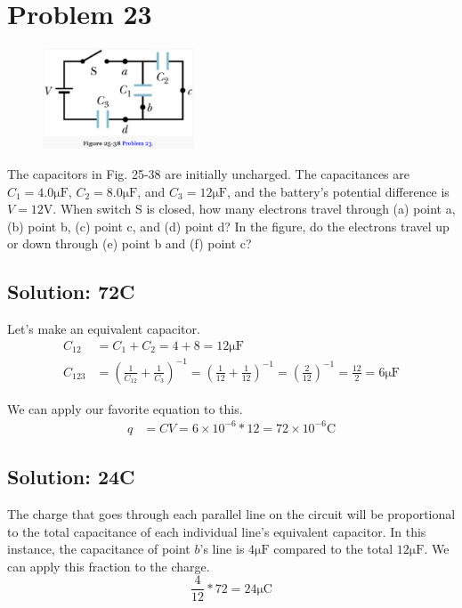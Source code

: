 \documentclass[12pt]{article}
\begin{document}
\pagebreak
\section{Problem 23}
\begin{figure}
    \vspace{-30pt}
    \includegraphics[width=0.4\textwidth]{picture_6.png} 
\end{figure}
The capacitors in Fig. 25-38 are initially uncharged. 
The capacitances are $C_1 = 4.0 \unit{\micro\farad}$, $C_2 = 8.0 \unit{\micro\farad}$, and $C_3 = 12 \unit{\micro\farad}$, and the battery's potential difference is $V = 12 \unit{\volt}$. 
When switch S is closed, how many electrons travel through (a) point a, (b) point b, (c) point c, and (d) point d? 
In the figure, do the electrons travel up or down through (e) point b and (f) point c?

\subsection{Solution: 72\textmu C}
Let's make an equivalent capacitor. 
\begin{align*}
    C_{12}  &=  C_1 + C_2 = 4 + 8 = 12 \unit{\micro\farad}\\
    C_{123} &=  \left( \frac{1}{C_{12}} + \frac{1}{C_3} \right)^{-1}
        =   \left( \frac{1}{12} + \frac{1}{12} \right)^{-1}
        =   \left( \frac{2}{12} \right)^{-1}
        =   \frac{12}{2}
        =   6\unit{\micro\farad}
\end{align*}

We can apply our favorite equation to this.
\begin{align*}
    q   &=  CV
        =   6 \times 10^{-6} * 12
        =   \boxed{72 \times 10^{-6} \unit{\coulomb}}
\end{align*}

\subsection{Solution: 24\textmu C}
The charge that goes through each parallel line on the circuit will be proportional to the total capacitance of each individual line's equivalent capacitor.
In this instance, the capacitance of point $b$'s line is $4\unit{\micro\farad}$ compared to the total $12\unit{\micro\farad}$. 
We can apply this fraction to the charge. 
\[\frac{4}{12}*72 = \boxed{24\unit{\micro\coulomb}}\]
\end{document}
